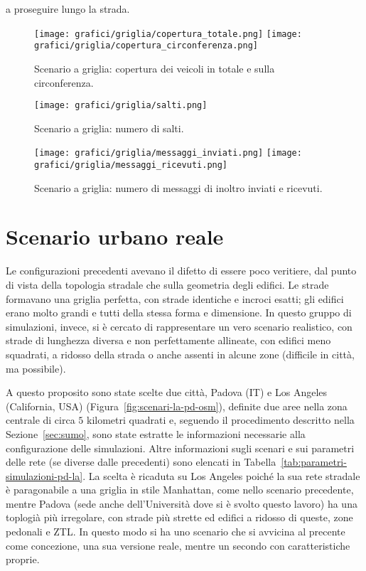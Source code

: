 a proseguire lungo la strada.
%
\begin{figure}[htbp]
	\centering
		\texttt{[image: grafici/griglia/copertura\_totale.png]}
		\texttt{[image: grafici/griglia/copertura\_circonferenza.png]}
\caption{Scenario a griglia: copertura dei veicoli in totale e sulla circonferenza.\label{fig:risultati-griglia-copertura}}
\end{figure}
%
\begin{figure}[htbp]
	\centering
		\texttt{[image: grafici/griglia/salti.png]}
\caption{Scenario a griglia: numero di salti.\label{fig:risultati-griglia-salti}}
\end{figure}
%
\begin{figure}[htbp]
	\centering
		\texttt{[image: grafici/griglia/messaggi\_inviati.png]}
		\texttt{[image: grafici/griglia/messaggi\_ricevuti.png]}
\caption{Scenario a griglia: numero di messaggi di inoltro inviati e ricevuti.\label{fig:risultati-griglia-messaggi}}
\end{figure}
\clearpage
%
%
\section{Scenario urbano reale}\label{sec:configurazione-la-pd} %
Le configurazioni precedenti avevano il difetto di essere poco veritiere, dal punto di vista della topologia stradale
che sulla geometria degli edifici.
Le strade formavano una griglia perfetta, con strade identiche e incroci esatti;
gli edifici erano molto grandi e tutti della stessa forma e dimensione.
In questo gruppo di simulazioni, invece, si è cercato di rappresentare un vero scenario realistico,
con strade di lunghezza diversa e non perfettamente allineate,
con edifici meno squadrati, a ridosso della strada o anche assenti in alcune zone (difficile in città, ma possibile).

A questo proposito sono state scelte due città, Padova (IT) e Los Angeles (California, USA) (Figura~\ref{fig:scenari-la-pd-osm}), definite due aree nella zona centrale di circa $5$ kilometri quadrati
e, seguendo il procedimento descritto nella Sezione~\ref{sec:sumo}, sono state estratte le informazioni necessarie alla configurazione delle simulazioni.
Altre informazioni sugli scenari e sui parametri delle rete (se diverse dalle precedenti) sono elencati in Tabella~\ref{tab:parametri-simulazioni-pd-la}.
La scelta è ricaduta su Los Angeles poiché la sua rete stradale è paragonabile a una griglia in stile Manhattan, come nello scenario precedente,
mentre Padova (sede anche dell'Università dove si è svolto questo lavoro) ha una toplogià più irregolare, con strade più strette ed edifici a ridosso di queste,
zone pedonali e ZTL.
In questo modo si ha uno scenario che si avvicina al precente come concezione,
una sua versione reale, mentre un secondo con caratteristiche proprie.

